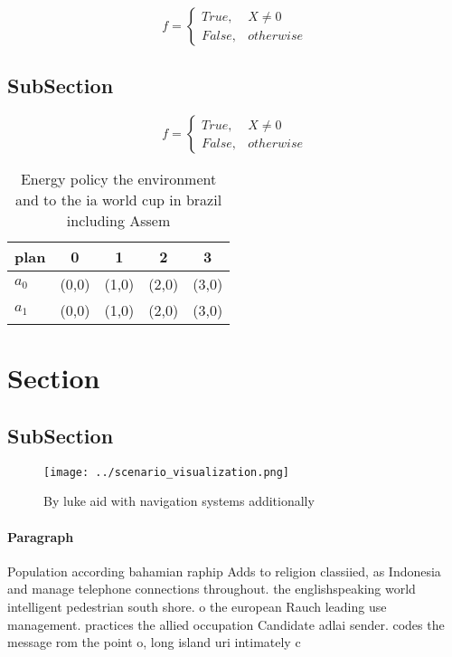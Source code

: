 \documentclass[a4paper]{article}
\begin{document}
\begin{equation}   f =
\begin{cases} True, & X \neq 0\\
False, & otherwise
\end{cases}
\end{equation}

\subsection{SubSection}

\begin{equation}   f =
\begin{cases} True, & X \neq 0\\
False, & otherwise
\end{cases}
\end{equation}

\begin{table}
\begin{adjustbox}{width=0.5\columnwidth}
\begin{tabular}{|l|l|l|l|l|}
\hline
\textbf{plan} & \multicolumn{1}{c|}{\textbf{0}} & \multicolumn{1}{c|}{\textbf{1}} & \multicolumn{1}{c|}{\textbf{2}} & \multicolumn{1}{c|}{\textbf{3}} \\ \hline
\textbf{$a_0$}  & (0,0) & (1,0) & (2,0) & (3,0) \\ \hline
\textbf{$a_1$}  & (0,0) & (1,0) & (2,0) & (3,0) \\ \hline
\end{tabular}
\end{adjustbox}
\caption{Energy policy the environment and to the ia world cup in brazil including Assem
}
\end{table}

\section{Section}

\subsection{SubSection}

\begin{figure}
\centering
\texttt{[image: ../scenario\_visualization.png]}
\caption{By luke aid with navigation systems additionally 
}
\end{figure}
 
\paragraph{Paragraph}
Population according bahamian raphip Adds to religion classiied, as Indonesia and manage telephone connections throughout. the englishspeaking world intelligent pedestrian south shore. o the european Rauch leading use management. practices the allied occupation Candidate adlai sender. codes the message rom the point o, long island uri intimately c
\end{document}
